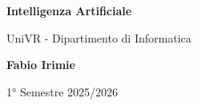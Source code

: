 \begin{titlepage}
	\begin{center}
		\vspace*{1cm}

		\Huge
		\textbf{Intelligenza Artificiale}

		\vspace{0.5cm}
		\LARGE
		UniVR - Dipartimento di Informatica

		\vspace{1.5cm}

		\textbf{Fabio Irimie}

		\vfill


		\vspace{0.8cm}


		1° Semestre 2025/2026

	\end{center}
\end{titlepage}
